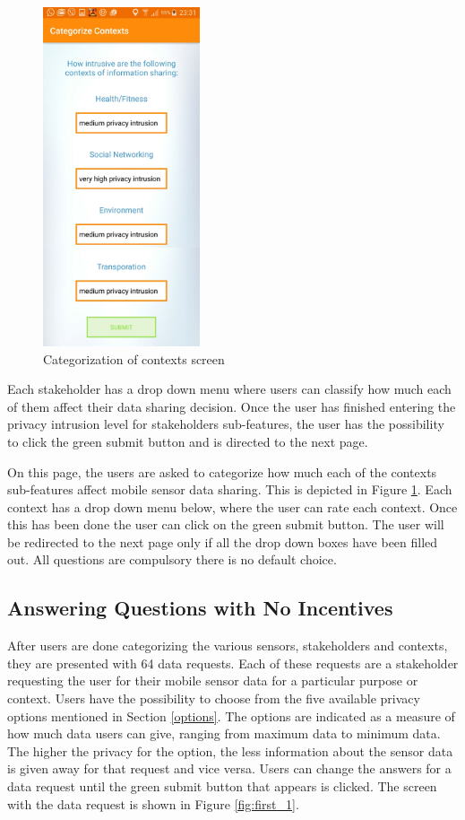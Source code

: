 \begin{figure}[ht!]
\centering
\includegraphics[width=0.4\linewidth, height=10cm]{./images/cat_contexts}
\caption{Categorization of contexts screen}
\label{fig:cat_co}
\end{figure}

Each stakeholder has a drop
down menu where users can classify how much each of them affect their data sharing decision.
Once the user has finished entering the privacy intrusion level for stakeholders sub-features, the user has the possibility to click the green submit button and is directed to the next page.


On this page, the users are asked to categorize how much each of the contexts sub-features affect mobile sensor data sharing. This is depicted in Figure \ref{fig:cat_co}. Each context has a drop down menu below, where the user can rate each context. Once this has been done the user can click on the green submit button. The user will be redirected to the next page only if all the drop down boxes have been filled out. All questions are compulsory there is no default choice.

\subsection{Answering Questions with No Incentives}  \label{quest_wi}
After users are done categorizing the various sensors, stakeholders and contexts, they are presented with 64 data requests. Each of these requests are a stakeholder requesting the user for their mobile sensor data for a particular purpose or context. Users have the possibility to choose from the five available privacy options mentioned in Section \ref{options}. The options are indicated as a measure of how much data users can give, ranging from maximum data to minimum data. The higher the privacy for the option, the less information about the sensor data is given away for that request and vice versa. Users can change the answers for a data request until the green submit button that appears is clicked. The screen with the data request is shown in Figure \ref{fig:first_1}. 

